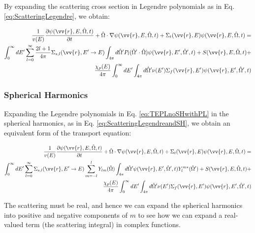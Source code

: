 \documentclass[10pt]{article}
\newcommand{\hO}{\hat{\Omega}}
\begin{document}
\begin{flushleft}
By expanding the scattering cross section in Legendre polynomials as in Eq. \ref{eq:ScatteringLegendre}, we obtain:

\begin{equation}
\label{eq:TEPLnoSHwithPL}
\begin{aligned}
\frac{1}{v(E)} \frac{\partial\psi(\vv{r}, E, \hO  ,t)}{\partial t} +
 \hO  \cdot\nabla\psi(\vv{r}, E, \hO  ,t) + 
 \Sigma_t(\vv{r},E)\psi(\vv{r}, E, \hO  ,t) = \\
 \int_{0}^{\infty}dE' \sum_{l=0}^{\infty} \frac{2l+1}{4\pi}\Sigma_{s,l}(\vv{r}, E'\rightarrow E) \int_{4\pi}^{} d\hO  'P_l(\hO  '\cdot\hO  )\psi(\vv{r}, E', \hO  ', t) + S(\vv{r}, E, \hO  ,t)+\\
  \frac{\chi_p(E)}{4\pi} \int_{0}^{\infty} dE'\int_{4\pi}^{} d\hO  '\nu(E')\Sigma_f(\vv{r}, E')\psi(\vv{r}, E', \hO  ',t)\\
\end{aligned}
\end{equation}

\subsubsection{Spherical Harmonics}

Expanding the Legendre polynomials in Eq. \eqref{eq:TEPLnoSHwithPL} in the spherical harmonics, as in Eq. \ref{eq:ScatteringLegendreandSH}, we obtain an equivalent form of the transport equation:

\begin{equation}
\label{eq:TEPLnomoments}
\begin{aligned}
\frac{1}{v(E)} \frac{\partial\psi(\vv{r}, E, \hO  ,t)}{\partial t} +
 \hO  \cdot\nabla\psi(\vv{r}, E, \hO  ,t) + 
 \Sigma_t(\vv{r},E)\psi(\vv{r}, E, \hO  ,t) = \\
 \int_{0}^{\infty}dE' \sum_{l=0}^{\infty} \Sigma_{s,l}(\vv{r}, E'\rightarrow E) \sum_{m=-l}^{l} Y_{lm}(\hO  )\int_{4\pi}^{} d\hO  '\psi(\vv{r}, E', \hO  ', t)Y_l^{m*}(\hO  ') + S(\vv{r}, E, \hO  ,t)+\\
 \frac{\chi_p(E)}{4\pi} \int_{0}^{\infty} dE'\int_{4\pi}^{} d\hO  '\nu(E')\Sigma_f(\vv{r}, E')\psi(\vv{r}, E', \hO  ',t)\\
\end{aligned}
\end{equation}

The scattering must be real, and hence we can expand the spherical harmonics into positive and negative components of \(m\) to see how we can expand a real-valued term (the scattering integral) in complex functions. 


\end{flushleft}
\end{document}

